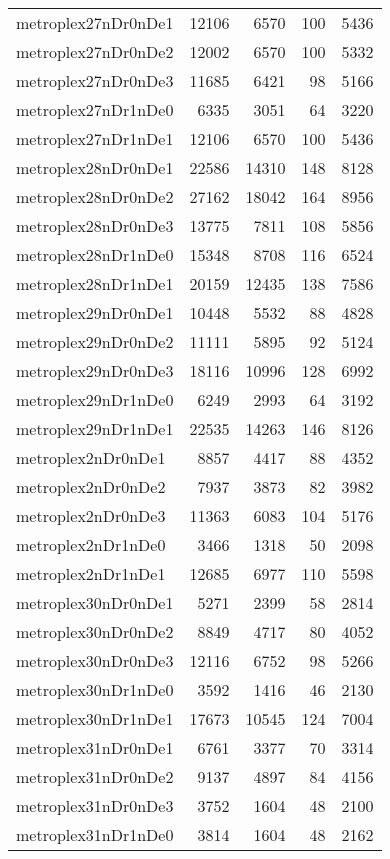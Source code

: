 \begin{longtable}{lrrrr}
metroplex27nDr0nDe1 & 12106 & 6570 & 100 & 5436 \\
metroplex27nDr0nDe2 & 12002 & 6570 & 100 & 5332 \\
metroplex27nDr0nDe3 & 11685 & 6421 & 98 & 5166 \\
metroplex27nDr1nDe0 & 6335 & 3051 & 64 & 3220 \\
metroplex27nDr1nDe1 & 12106 & 6570 & 100 & 5436 \\
metroplex28nDr0nDe1 & 22586 & 14310 & 148 & 8128 \\
metroplex28nDr0nDe2 & 27162 & 18042 & 164 & 8956 \\
metroplex28nDr0nDe3 & 13775 & 7811 & 108 & 5856 \\
metroplex28nDr1nDe0 & 15348 & 8708 & 116 & 6524 \\
metroplex28nDr1nDe1 & 20159 & 12435 & 138 & 7586 \\
metroplex29nDr0nDe1 & 10448 & 5532 & 88 & 4828 \\
metroplex29nDr0nDe2 & 11111 & 5895 & 92 & 5124 \\
metroplex29nDr0nDe3 & 18116 & 10996 & 128 & 6992 \\
metroplex29nDr1nDe0 & 6249 & 2993 & 64 & 3192 \\
metroplex29nDr1nDe1 & 22535 & 14263 & 146 & 8126 \\
metroplex2nDr0nDe1 & 8857 & 4417 & 88 & 4352 \\
metroplex2nDr0nDe2 & 7937 & 3873 & 82 & 3982 \\
metroplex2nDr0nDe3 & 11363 & 6083 & 104 & 5176 \\
metroplex2nDr1nDe0 & 3466 & 1318 & 50 & 2098 \\
metroplex2nDr1nDe1 & 12685 & 6977 & 110 & 5598 \\
metroplex30nDr0nDe1 & 5271 & 2399 & 58 & 2814 \\
metroplex30nDr0nDe2 & 8849 & 4717 & 80 & 4052 \\
metroplex30nDr0nDe3 & 12116 & 6752 & 98 & 5266 \\
metroplex30nDr1nDe0 & 3592 & 1416 & 46 & 2130 \\
metroplex30nDr1nDe1 & 17673 & 10545 & 124 & 7004 \\
metroplex31nDr0nDe1 & 6761 & 3377 & 70 & 3314 \\
metroplex31nDr0nDe2 & 9137 & 4897 & 84 & 4156 \\
metroplex31nDr0nDe3 & 3752 & 1604 & 48 & 2100 \\
metroplex31nDr1nDe0 & 3814 & 1604 & 48 & 2162 \\

\end{longtable}
